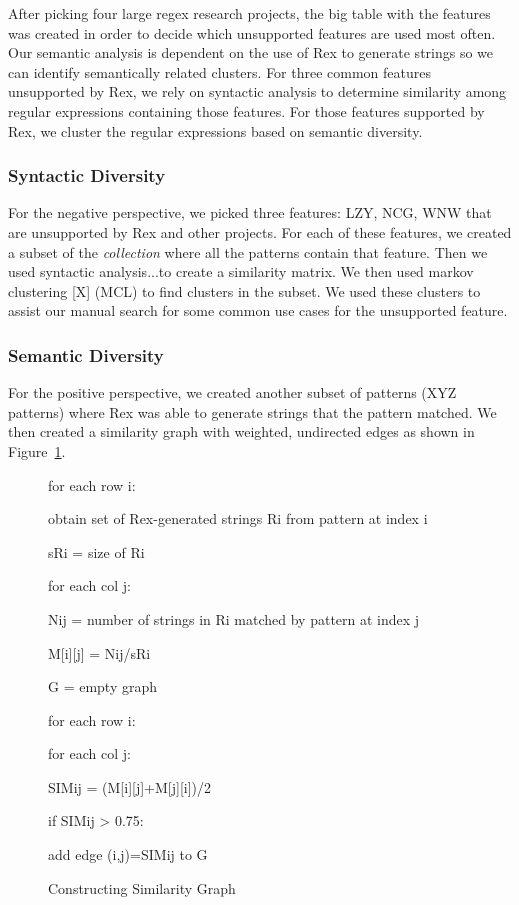 After picking four large regex research projects, the big table with the features was created in order to decide which unsupported features are used most often.
Our semantic analysis is dependent on the use of Rex to generate strings so we can identify semantically related clusters. For three common features unsupported by Rex, we rely on syntactic analysis to determine similarity among regular expressions containing those features. For those features supported by Rex, we cluster the regular expressions based on semantic diversity.

\subsubsection{Syntactic Diversity}
For the negative perspective, we picked three features: LZY, NCG, WNW that are unsupported by Rex and other projects.  For each of these features, we created a subset of the \emph{collection} where all the patterns contain that feature.  Then we used syntactic analysis...to create a similarity matrix.  We then used markov clustering [X] (MCL) to find clusters in the subset.  We used these clusters to assist our manual search for some common use cases for the unsupported feature.

\subsubsection{Semantic Diversity}
For the positive perspective, we created another subset of patterns (XYZ patterns) where Rex was able to generate strings that the pattern matched.  We then created a similarity graph with weighted, undirected edges as shown in Figure~\ref{fig:similarityConstruction}.

\begin{figure}
\begin{description}
\setlength{\parskip}{0pt} %
\setlength{\itemindent}{0in}
\item for each row i:
\setlength{\itemindent}{0.2in}
\item obtain set of Rex-generated strings Ri from pattern at index i
\item sRi = size of Ri
\item for each col j:
\setlength{\itemindent}{0.4in}
\item Nij = number of strings in Ri matched by pattern at index j
\item M[i][j] = Nij/sRi
\setlength{\itemindent}{0in}
\item G = empty graph
\item for each row i:
\setlength{\itemindent}{0.2in}
\item for each col j:
\setlength{\itemindent}{0.4in}
\item SIMij = (M[i][j]+M[j][i])/2
\item if SIMij > 0.75:
\setlength{\itemindent}{0.6in}
\item add edge (i,j)=SIMij to G
\setlength{\itemindent}{0in}
\setlength{\parskip}{10pt} %
\end{description}
\caption{Constructing Similarity Graph \label{fig:similarityConstruction}}
\end{figure}

